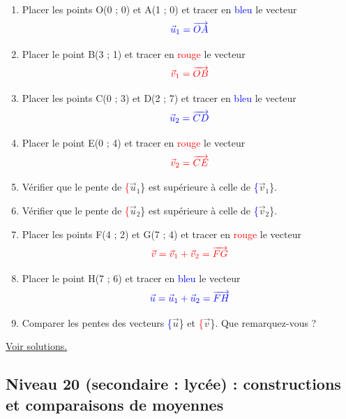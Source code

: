 \documentclass[11pt]{article}
\begin{document}
\begin{enumerate}
\item Placer les points O(0 ; 0) et A(1 ; 0) et tracer en
\textcolor{blue}{bleu} le vecteur \[\textcolor{blue}{\vec{u}_1 =
   \overrightarrow{OA}}\]
\item Placer le point B(3 ; 1) et tracer en \textcolor{red}{rouge} le
vecteur \[\textcolor{red}{\vec{v}_1 = \overrightarrow{OB}}\]
\item Placer les points C(0 ; 3) et D(2 ; 7) et tracer en
\textcolor{blue}{bleu} le vecteur \[\textcolor{blue}{\vec{u}_2 =
   \overrightarrow{CD}}\]
\item Placer le point E(0 ; 4) et tracer en \textcolor{red}{rouge} le
vecteur \[\textcolor{red}{\vec{v}_2 = \overrightarrow{CE}}\]
\item Vérifier que le pente de \textcolor{red}\{\(\vec{u}_1\)\} est
supérieure à celle de \textcolor{blue}\{\(\vec{v}_1\)\}.
\item Vérifier que le pente de \textcolor{red}\{\(\vec{u}_2\)\} est
supérieure à celle de \textcolor{blue}\{\(\vec{v}_2\)\}.
\item Placer les points F(4 ; 2) et G(7 ; 4) et tracer en
\textcolor{red}{rouge} le vecteur \[\textcolor{red}{\vec{v} =
   \vec{v}_1 + \vec{v}_2 = \overrightarrow{FG}}\]
\item Placer le point H(7 ; 6) et tracer en \textcolor{blue}{bleu} le
vecteur \[\textcolor{blue}{\vec{u} = \vec{u}_1 + \vec{u}_2  =
   \overrightarrow{FH}}\]
\item Comparer les pentes des vecteurs \textcolor{blue}\{\(\vec{u}\)\} et
\textcolor{red}\{\(\vec{v}\)\}. Que remarquez-vous ?
\end{enumerate}


\hyperref[orgab8d939]{Voir solutions.}


\newpage


\subsection{Niveau 20 (secondaire : lycée) : constructions et comparaisons de moyennes}
\label{sec:org21c89ed}

\label{org7d8c58b}
\end{document}
